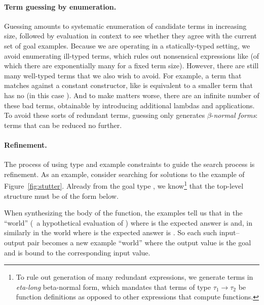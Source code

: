 \paragraph{Term guessing by enumeration.}
Guessing amounts to systematic enumeration of candidate terms in
increasing size, followed by evaluation in context to see whether they
agree with the current set of goal examples.  Because we are operating
in a statically-typed setting, we avoid enumerating ill-typed terms,
which rules out nonsensical expressions like  (of which
there are exponentially many for a fixed term size).  However, there are
still many well-typed terms that we also wish to avoid. For example, a term
that matches against a constant constructor, like  is equivalent to a smaller term that has no
 (in this case ).  And to make matters worse, there
are an infinite number of these bad terms, obtainable by introducing
additional lambdas and applications.  To avoid these sorts of
redundant terms, guessing only generates $\beta$-\emph{normal forms}:
terms that can be reduced no further.



\paragraph{Refinement.} The process of using type and example
constraints to guide the search process is refinement.  As an example,
consider searching for solutions to the  example of
Figure~\ref{fig:stutter}.  Already from the goal type , we know\footnote{To rule out generation of many redundant expressions, we
generate terms in \emph{eta-long} beta-normal form,
which mandates that terms of type $\tau_1 \rightarrow \tau_2$ be
function definitions as opposed to other expressions that compute
functions.}  that the top-level structure must be of the form 
below.

\begin{center}
\end{center}

\noindent  When synthesizing the body of
the function, the examples tell us that in the ``world'' (\ie\ a
hypothetical evaluation of ) where  is \cd{[]} the
expected answer is \cd{[]} and, in similarly in the world where
 is \cd{[0]} the expected answer is \cd{[0;0]}.  So each such
input--output pair becomes a new example ``world'' where the output
value is the goal and  is bound to the corresponding input
value.

